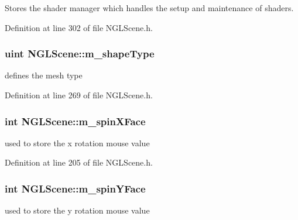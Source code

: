 Stores the shader manager which handles the setup and maintenance of shaders. 



Definition at line 302 of file N\-G\-L\-Scene.\-h.

\subsubsection[{m\-\_\-shape\-Type}]{\setlength{\rightskip}{0pt plus 5cm}uint N\-G\-L\-Scene\-::m\-\_\-shape\-Type\hspace{0.3cm}{\ttfamily [private]}}\label{class_n_g_l_scene_ade87529130d937657630ead75f8adabf}


defines the mesh type 



Definition at line 269 of file N\-G\-L\-Scene.\-h.

\subsubsection[{m\-\_\-spin\-X\-Face}]{\setlength{\rightskip}{0pt plus 5cm}int N\-G\-L\-Scene\-::m\-\_\-spin\-X\-Face\hspace{0.3cm}{\ttfamily [private]}}\label{class_n_g_l_scene_a6d944b2d4d36500b2170bc9e7f48cd3e}


used to store the x rotation mouse value 



Definition at line 205 of file N\-G\-L\-Scene.\-h.

\subsubsection[{m\-\_\-spin\-Y\-Face}]{\setlength{\rightskip}{0pt plus 5cm}int N\-G\-L\-Scene\-::m\-\_\-spin\-Y\-Face\hspace{0.3cm}{\ttfamily [private]}}\label{class_n_g_l_scene_adba42c61d2ebee4a72f56563f8f62899}


used to store the y rotation mouse value 



